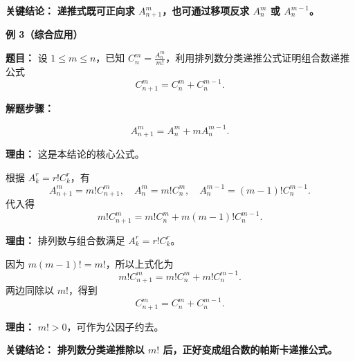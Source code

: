 \begin{examplebox}
\textbf{\textcolor{CExample}{关键结论：}} \textbf{递推式既可正向求 $A_{n+1}^m$，也可通过移项反求 $A_n^m$ 或 $A_n^{m-1}$。}

\medskip
\textbf{\textcolor{CExample}{例 3（综合应用）}}

\textbf{\textcolor{CExample}{题目：}} 设 $1\leq m\leq n$，已知 $C_n^m=\frac{A_n^m}{m!}$，利用排列数分类递推公式证明组合数递推公式
\[
C_{n+1}^m=C_n^m+C_n^{m-1}.
\]

\textbf{\textcolor{CExample}{解题步骤：}}
\begin{description}[style=nextline, leftmargin=2.8em, labelsep=0.5em, itemsep=0.45em]
    \item[\textbf{第一步（写出排列数递推）：}]
    \[
    A_{n+1}^m=A_n^m+mA_n^{m-1}.
    \]
    \par\textbf{理由：} 这是本结论的核心公式。

    \item[\textbf{第二步（转成组合数）：}] 根据 $A_k^r=r!C_k^r$，有
    \[
    A_{n+1}^m=m!C_{n+1}^m,
    \quad A_n^m=m!C_n^m,
    \quad A_n^{m-1}=(m-1)!C_n^{m-1}.
    \]
    代入得
    \[
    m!C_{n+1}^m=m!C_n^m+m(m-1)!C_n^{m-1}.
    \]
    \par\textbf{理由：} 排列数与组合数满足 $A_k^r=r!C_k^r$。

    \item[\textbf{第三步（约去公因子）：}] 因为 $m(m-1)!=m!$，所以上式化为
    \[
    m!C_{n+1}^m=m!C_n^m+m!C_n^{m-1}.
    \]
    两边同除以 $m!$，得到
    \[
    C_{n+1}^m=C_n^m+C_n^{m-1}.
    \]
    \par\textbf{理由：} $m!>0$，可作为公因子约去。
\end{description}

\textbf{\textcolor{CExample}{关键结论：}} \textbf{排列数分类递推除以 $m!$ 后，正好变成组合数的帕斯卡递推公式。}
\end{examplebox}
